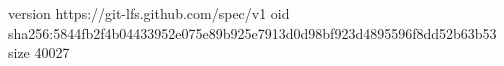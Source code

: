version https://git-lfs.github.com/spec/v1
oid sha256:5844fb2f4b04433952e075e89b925e7913d0d98bf923d4895596f8dd52b63b53
size 40027
